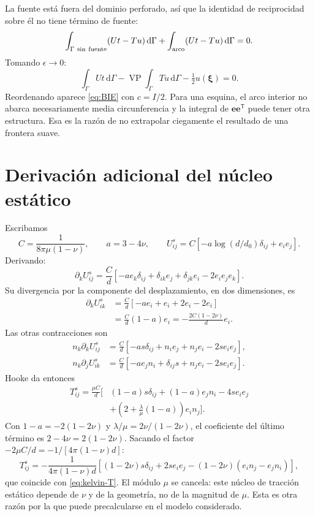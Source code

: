 \documentclass[11pt,a4paper]{report}
\numberwithin{equation}{chapter}
\newcommand{\vect}[1]{\bm{#1}}
\newcommand{\dd}{\,\mathrm{d}}
\newcommand{\VP}{\operatorname{VP}}
\begin{document}
La fuente est\'a fuera del dominio perforado, as\'i que la identidad
de reciprocidad sobre \'el no tiene t\'ermino de fuente:
\begin{equation}
 \int_{\Gamma\ {\rm sin\ fuente}}(Ut-Tu)\dd\Gamma
 +\int_{\rm arco}(Ut-Tu)\dd\Gamma=0.
\end{equation}
Tomando $\epsilon\to0$:
\begin{equation}
 \int_\Gamma Ut\dd\Gamma-\VP\int_\Gamma Tu\dd\Gamma
       -\tfrac12u(\vect\xi)=0.
\end{equation}
Reordenando aparece \eqref{eq:BIE} con $c=I/2$.
Para una esquina, el arco interior no abarca necesariamente media
circunferencia y la integral de $\vect e\vect e^{\mathsf T}$ puede
tener otra estructura. Esa es la raz\'on de no extrapolar ciegamente
el resultado de una frontera suave.

\chapter{Derivaci\'on adicional del n\'ucleo est\'atico}
\label{app:kelvin}
Escribamos
\begin{equation}
 C=\frac1{8\pi\mu(1-\nu)},\qquad a=3-4\nu,\qquad
 U^s_{ij}=C[-a\log(d/d_0)\delta_{ij}+e_ie_j].
\end{equation}
Derivando:
\begin{equation}
 \partial_kU^s_{ij}=\frac Cd
 [-ae_k\delta_{ij}+\delta_{ik}e_j+\delta_{jk}e_i
                                     -2e_ie_je_k].
\end{equation}
Su divergencia por la componente del desplazamiento, en dos dimensiones,
es
\begin{align}
 \partial_kU^s_{ik}
 &=\frac Cd[-ae_i+e_i+2e_i-2e_i]\\
 &=\frac Cd(1-a)e_i
   =-\frac{2C(1-2\nu)}d e_i.
\end{align}
Las otras contracciones son
\begin{align}
 n_k\partial_kU^s_{ij}
 &=\frac Cd[-as\delta_{ij}+n_ie_j+n_je_i-2se_ie_j],\\
 n_k\partial_jU^s_{ik}
 &=\frac Cd[-ae_jn_i+\delta_{ij}s+n_je_i-2se_ie_j].
\end{align}
Hooke da entonces
\begin{align}
 T^s_{ij}=\frac{\mu C}d\bigg[
 &(1-a)s\delta_{ij}+(1-a)e_jn_i-4se_ie_j\\
 &+\left(2+\frac{\lambda}{\mu}(1-a)\right)e_in_j\bigg].
\end{align}
Con $1-a=-2(1-2\nu)$ y
$\lambda/\mu=2\nu/(1-2\nu)$, el coeficiente del \'ultimo t\'ermino es
$2-4\nu=2(1-2\nu)$.
Sacando el factor $-2\mu C/d=-1/[4\pi(1-\nu)d]$:
\begin{equation}
 T^s_{ij}=-\frac1{4\pi(1-\nu)d}
 \left[(1-2\nu)s\delta_{ij}+2se_ie_j
       -(1-2\nu)(e_in_j-e_jn_i)\right],
\end{equation}
que coincide con \eqref{eq:kelvin-T}. El m\'odulo $\mu$ se cancela:
este n\'ucleo de tracci\'on est\'atico depende de $\nu$ y de la geometr\'ia,
no de la magnitud de $\mu$. Esta es otra raz\'on por la que puede
precalcularse en el modelo considerado.
\end{document}
